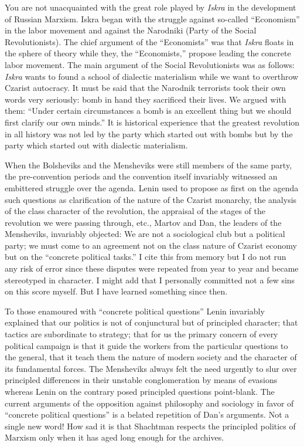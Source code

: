 You are not unacquainted with the great role played by \emph{Iskra} in the development of Russian Marxism. Iskra began with the struggle against so-called “Economism” in the labor movement and against the Narodniki (Party of the Social Revolutionists). The chief argument of the “Economists” was that \emph{Iskra} floats in the sphere of theory while they, the “Economists,” propose leading the concrete labor movement. The main argument of the Social Revolutionists was as follows: \emph{Iskra} wants to found a school of dialectic materialism while we want to overthrow Czarist autocracy. It must be said that the Narodnik terrorists took their own words very seriously: bomb in hand they sacrificed their lives. We argued with them: “Under certain circumstances a bomb is an excellent thing but we should first clarify our own minds.” It is historical experience that the greatest revolution in all history was not led by the party which started out with bombs but by the party which started out with dialectic materialism.

When the Bolsheviks and the Mensheviks were still members of the same party, the pre-convention periods and the convention itself invariably witnessed an embittered struggle over the agenda. Lenin used to propose as first on the agenda such questions as clarification of the nature of the Czarist monarchy, the analysis of the class character of the revolution, the appraisal of the stages of the revolution we were passing through, etc., Martov and Dan, the leaders of the Mensheviks, invariably objected: We are not a sociological club but a political party; we must come to an agreement not on the class nature of Czarist economy but on the “concrete political tasks.” I cite this from memory but I do not run any risk of error since these disputes were repeated from year to year and became stereotyped in character. I might add that I personally committed not a few sins on this score myself. But I have learned something since then.
\noclub

To those enamoured with “concrete political questions” Lenin invariably explained that our politics is not of conjunctural but of principled character; that tactics are subordinate to strategy; that for us the primary concern of every political campaign is that it guide the workers from the particular questions to the general, that it teach them the nature of modern society and the character of its fundamental forces. The Mensheviks always felt the need urgently to slur over principled differences in their unstable conglomeration by means of evasions whereas Lenin on the contrary posed principled questions point-blank. The current arguments of the opposition against philosophy and sociology in favor of “concrete political questions” is a belated repetition of Dan’s arguments. Not a single new word! How sad it is that Shachtman respects the principled politics of Marxism only when it has aged long enough for the archives.

